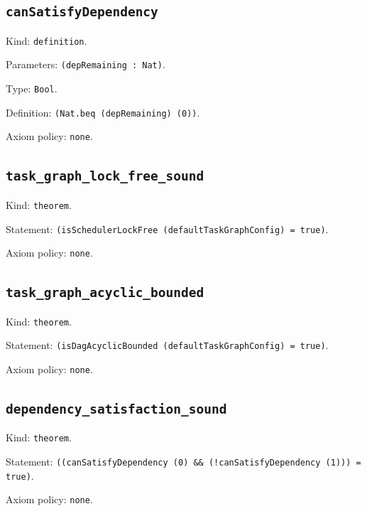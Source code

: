 \documentclass[11pt]{article}
\begin{document}
\subsection*{\texttt{canSatisfyDependency}}
\noindent Kind: \texttt{definition}.\par
\noindent Parameters: \texttt{(depRemaining : Nat)}.\par
\noindent Type: \texttt{Bool}.\par
\noindent Definition: \texttt{(Nat.beq (depRemaining) (0))}.\par
\noindent Axiom policy: \texttt{none}.\par
\subsection*{\texttt{task\_graph\_lock\_free\_sound}}
\noindent Kind: \texttt{theorem}.\par
\noindent Statement: \texttt{(isSchedulerLockFree (defaultTaskGraphConfig) = true)}.\par
\noindent Axiom policy: \texttt{none}.\par
\subsection*{\texttt{task\_graph\_acyclic\_bounded}}
\noindent Kind: \texttt{theorem}.\par
\noindent Statement: \texttt{(isDagAcyclicBounded (defaultTaskGraphConfig) = true)}.\par
\noindent Axiom policy: \texttt{none}.\par
\subsection*{\texttt{dependency\_satisfaction\_sound}}
\noindent Kind: \texttt{theorem}.\par
\noindent Statement: \texttt{((canSatisfyDependency (0) \&\& (!canSatisfyDependency (1))) = true)}.\par
\noindent Axiom policy: \texttt{none}.\par
\end{document}
